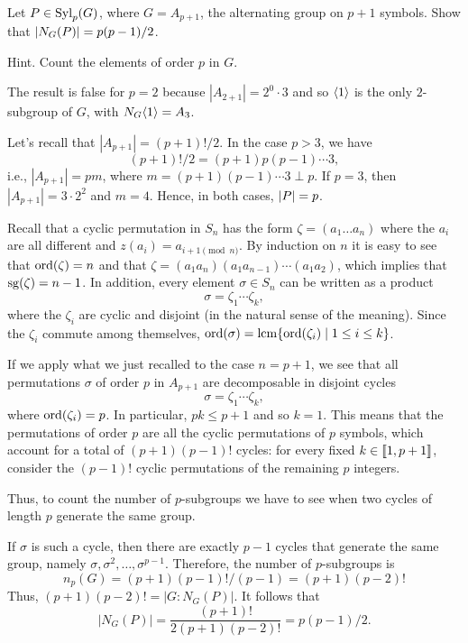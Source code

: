 \begin{probl}\label{problem-1.C.5}
    Let $P\in{\rm Syl}_p(G)$, where $G=A_{p+1}$, the alternating group on $p+1$ symbols. Show that $\left\vert{N_G(P)}\right\vert = p(p-1)/2$.

    \textrm{\upshape Hint. Count the elements of order $p$ in $G$.}
\end{probl}

\begin{solution} The result is false for $p=2$ because $|A_{2+1}|=2^0\cdot 3$ and so $\langle1\rangle$ is the only $2$-subgroup of $G$, with $N_G\langle1\rangle=A_3$.

Let's recall that $|A_{p+1}|=(p+1)!/2$. In the case $p>3$, we have
$$
    (p+1)!/2 = (p+1)p(p-1)\cdots3,
$$
i.e., $|A_{p+1}|=pm$, where $m=(p+1)(p-1)\cdots3\perp p$. If $p=3$, then $|A_{p+1}|=3\cdot2^2$ and $m=4$. Hence, in both cases, $\left\vert{P}\right\vert=p$.

Recall that a cyclic permutation in $S_n$ has the form $\zeta=(a_1\dots a_n)$ where the $a_i$ are all different and $z(a_i)=a_{i+1\pmod n}$. By induction on $n$ it is easy to see that ${\rm ord}(\zeta)=n$ and that $\zeta=(a_1 a_n)(a_1 a_{n-1})\cdots(a_1 a_2)$, which implies that $\operatorname{sg}(\zeta)=n-1$. In addition, every element $\sigma\in S_n$ can be written as a product
$$
    \sigma=\zeta_1\cdots\zeta_k,
$$
where the $\zeta_i$ are cyclic and disjoint (in the natural sense of the meaning). Since the $\zeta_i$ commute among themselves, ${\rm ord}(\sigma)=\operatorname{lcm}\{{\rm ord}(\zeta_i)\mid 1\le i\le k\}$.

If we apply what we just recalled to the case $n=p+1$, we see that all permutations $\sigma$ of order $p$ in $A_{p+1}$ are decomposable in disjoint cycles
$$
    \sigma=\zeta_1\cdots\zeta_k,
$$
where ${\rm ord}(\zeta_i)=p$. In particular, $pk\le p+1$ and so $k=1$. This means that the permutations of order $p$ are all the cyclic permutations of $p$ symbols, which account for a total of $(p+1)(p-1)!$ cycles: for every fixed $k\in\llbracket1,p+1\rrbracket$, consider the $(p-1)!$ cyclic permutations of the remaining $p$ integers.

Thus, to count the number of $p$-subgroups we have to see when two cycles of length $p$ generate the same group.

If $\sigma$ is such a cycle, then there are exactly $p-1$ cycles that generate the same group, namely $\sigma, \sigma^2,\dots,\sigma^{p-1}$. Therefore, the number of $p$-subgroups is 
$$
    n_p(G)=(p+1)(p-1)!/(p-1) = (p+1)(p-2)!
$$
Thus, $(p+1)(p-2)!=|G:N_G(P)|$. It follows that
$$
    |N_G(P)| = \frac{(p+1)!}{2(p+1)(p-2)!}=p(p-1)/2.
$$
 \end{solution}

